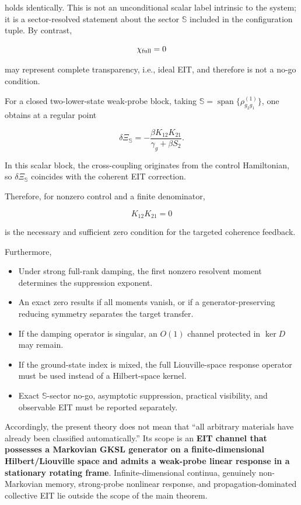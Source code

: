 \documentclass[
  10pt,
  a4paper,
]{article}
\providecommand{\tightlist}{%
  \setlength{\itemsep}{0pt}\setlength{\parskip}{0pt}}
\begin{document}
holds identically. This is not an unconditional scalar label intrinsic
to the system; it is a sector-resolved statement about the sector
\(\mathbb S\) included in the configuration tuple. By contrast,

\[
\chi_{\rm full}=0
\]

may represent complete transparency, i.e., ideal EIT, and therefore is
not a no-go condition.

For a closed two-lower-state weak-probe block, taking
\(\mathbb S=\operatorname{span}\{\rho_{g_2g_1}^{(1)}\}\), one obtains at
a regular point

\[
\delta\Xi_{\mathbb S}
=-\frac{\beta K_{12}K_{21}}
{\gamma_g+\beta S_2}.
\]

In this scalar block, the cross-coupling originates from the control
Hamiltonian, so \(\delta\Xi_{\mathbb S}\) coincides with the coherent
EIT correction.

Therefore, for nonzero control and a finite denominator,

\[
\boxed{K_{12}K_{21}=0}
\]

is the necessary and sufficient zero condition for the targeted
coherence feedback.

Furthermore,

\begin{itemize}
\tightlist
\item
  Under strong full-rank damping, the first nonzero resolvent moment
  determines the suppression exponent.
\item
  An exact zero results if all moments vanish, or if a
  generator-preserving reducing symmetry separates the target transfer.
\item
  If the damping operator is singular, an \(O(1)\) channel protected in
  \(\ker D\) may remain.
\item
  If the ground-state index is mixed, the full Liouville-space response
  operator must be used instead of a Hilbert-space kernel.
\item
  Exact \(\mathbb S\)-sector no-go, asymptotic suppression, practical
  visibility, and observable EIT must be reported separately.
\end{itemize}

Accordingly, the present theory does not mean that ``all arbitrary
materials have already been classified automatically.'' Its scope is an
\textbf{EIT channel that possesses a Markovian GKSL generator on a
finite-dimensional Hilbert/Liouville space and admits a weak-probe
linear response in a stationary rotating frame}. Infinite-dimensional
continua, genuinely non-Markovian memory, strong-probe nonlinear
response, and propagation-dominated collective EIT lie outside the scope
of the main theorem.
\end{document}
